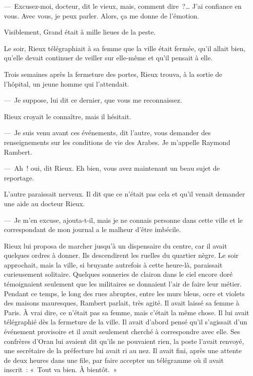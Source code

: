 \documentclass[french,twoside]{book} %
\begin{document}
— Excusez-moi, docteur, dit le vieux, mais, comment dire ?… J’ai confiance en vous. Avec vous, je peux parler. Alors, ça me donne de l’émotion.\par
Visiblement, Grand était à mille lieues de la peste.\par
Le soir, Rieux télégraphiait à sa femme que la ville était fermée, qu’il allait bien, qu’elle devait continuer de veiller sur elle-même et qu’il pensait à elle.\par
Trois semaines après la fermeture des portes, Rieux trouva, à la sortie de l’hôpital, un jeune homme qui l’attendait.\par
— Je suppose, lui dit ce dernier, que vous me reconnaissez.\par
Rieux croyait le connaître, mais il hésitait.\par
— Je suis venu avant ces événements, dit l’autre, vous demander des renseignements sur les conditions de vie des Arabes. Je m’appelle Raymond Rambert.\par
— Ah ! oui, dit Rieux. Eh bien, vous avez maintenant un beau sujet de reportage.\par
L’autre paraissait nerveux. Il dit que ce n’était pas cela et qu’il venait demander une aide au docteur Rieux.\par
— Je m’en excuse, ajouta-t-il, mais je ne connais personne dans cette ville et le correspondant de mon journal a le malheur d’être imbécile.\par
Rieux lui proposa de marcher jusqu’à un dispensaire du centre, car il avait quelques ordres à donner. Ils descendirent les ruelles du quartier nègre. Le soir approchait, mais la ville, si bruyante autrefois à cette heure-là, paraissait curieusement solitaire. Quelques sonneries de clairon dans le ciel encore doré témoignaient seulement que les militaires se donnaient l’air de faire leur métier. Pendant ce temps, le long des rues abruptes, entre les murs bleus, ocre et violets des maisons mauresques, Rambert parlait, très agité. Il avait laissé sa femme à Paris. À vrai dire, ce n’était pas sa femme, mais c’était la même chose. Il lui avait télégraphié dès la fermeture de la ville. Il avait d’abord pensé qu’il s’agissait d’un événement provisoire et il avait seulement cherché à correspondre avec elle. Ses confrères d’Oran lui avaient dit qu’ils ne pouvaient rien, la poste l’avait renvoyé, une secrétaire de la préfecture lui avait ri au nez. Il avait fini, après une attente de deux heures dans une file, par faire accepter un télégramme où il avait inscrit : « Tout va bien. À bientôt. »\par
\end{document}
